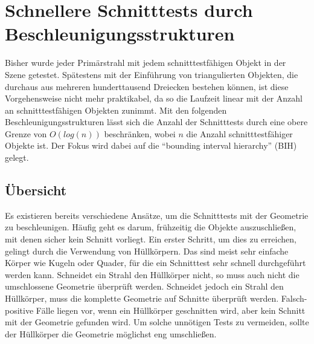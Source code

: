 
\chapter{Schnellere Schnitttests durch Beschleunigungsstrukturen} \label{ch:beschleunigung}

Bisher wurde jeder Primärstrahl mit jedem schnitttestfähigen Objekt in der Szene getestet.
Spätestens mit der Einführung von triangulierten Objekten, die durchaus aus mehreren hunderttausend Dreiecken bestehen können, ist diese Vorgehensweise nicht mehr praktikabel, da so die Laufzeit linear mit der Anzahl an schnitttestfähigen Objekten zunimmt. Mit den folgenden Beschleunigungsstrukturen lässt sich die Anzahl der Schnitttests durch eine obere Grenze von \( O(log(n)) \) beschränken, wobei \( n \) die Anzahl schnitttestfähiger Objekte ist. Der Fokus wird dabei auf die "`bounding interval hierarchy"' (BIH) \cite{wachter2006InsRayTraBouIntHie} gelegt.

\section{Übersicht}

Es existieren bereits verschiedene Ansätze, um die Schnitttests mit der Geometrie zu beschleunigen. Häufig geht es darum, frühzeitig die Objekte auszuschließen, mit denen sicher kein Schnitt vorliegt. Ein erster Schritt, um dies zu erreichen, gelingt durch die Verwendung von Hüllkörpern. Das sind meist sehr einfache Körper wie Kugeln oder Quader, für die ein Schnitttest sehr schnell durchgeführt werden kann. Schneidet ein Strahl den Hüllkörper nicht, so muss auch nicht die umschlossene Geometrie überprüft werden. Schneidet jedoch ein Strahl den Hüllkörper, muss die komplette Geometrie auf Schnitte überprüft werden. Falsch-positive Fälle liegen vor, wenn ein Hüllkörper geschnitten wird, aber kein Schnitt mit der Geometrie gefunden wird. Um solche unnötigen Tests zu vermeiden, sollte der Hüllkörper die Geometrie möglichst eng umschließen.


